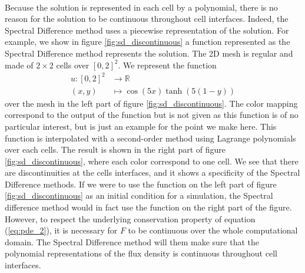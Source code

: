      \paragraph{}
      Because the solution is represented in each cell by a polynomial, there is no reason for the solution to be continuous throughout cell interfaces.
      Indeed, the Spectral Difference method uses a piecewise representation of the solution.
      For example, we show in figure \ref{fig:sd_discontinuous} a function represented as the Spectral Difference method represents the solution.
      The 2D mesh is regular and made of $2 \times 2$ cells over $\left[0, 2\right]^2$.
      We represent the function
      \begin{equation}
        \begin{aligned}
          u \colon \left[0, 2\right]^2 &\to \mathbb{R}\\
          \left(x, y\right) &\mapsto \cos\left(5x\right) \tanh\left(5\left(1 - y\right)\right)
        \end{aligned}
      \end{equation}
      over the mesh in the left part of figure \ref{fig:sd_discontinuous}.
      The color mapping correspond to the output of the function but is not given as this function is of no particular interest, but is just an example for the point we make here.
      This function is interpolated with a second-order method using Lagrange polynomials over each cells.
      The result is shown in the right part of figure \ref{fig:sd_discontinuous}, where each color correspond to one cell.
      We see that there are discontinuities at the cells interfaces, and it shows a specificity of the Spectral Difference methods.
      If we were to use the function on the left part of figure \ref{fig:sd_discontinuous} as an initial condition for a simulation, the Spectral difference method would in fact use the function on the right part of the figure.
      However, to respect the underlying conservation property of equation (\ref{eq:pde_2}), it is necessary for $F$ to be continuous over the whole computational domain.
      The Spectral Difference method will them make sure that the polynomial representations of the flux density is continuous throughout cell interfaces.

